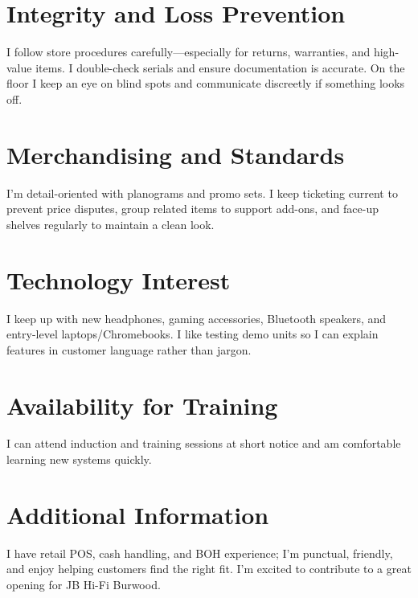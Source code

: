 \documentclass[a4paper,10pt]{article}
\begin{document}
\section*{Integrity and Loss Prevention}
I follow store procedures carefully—especially for returns, warranties, and high-value items. I double-check serials and ensure documentation is accurate. On the floor I keep an eye on blind spots and communicate discreetly if something looks off.
\section*{Merchandising and Standards}
I’m detail-oriented with planograms and promo sets. I keep ticketing current to prevent price disputes, group related items to support add-ons, and face-up shelves regularly to maintain a clean look.
\section*{Technology Interest}
I keep up with new headphones, gaming accessories, Bluetooth speakers, and entry-level laptops/Chromebooks. I like testing demo units so I can explain features in customer language rather than jargon.
\section*{Availability for Training}
I can attend induction and training sessions at short notice and am comfortable learning new systems quickly.
\section*{Additional Information}
I have retail POS, cash handling, and BOH experience; I’m punctual, friendly, and enjoy helping customers find the right fit. I’m excited to contribute to a great opening for JB Hi-Fi Burwood.
\end{document}
